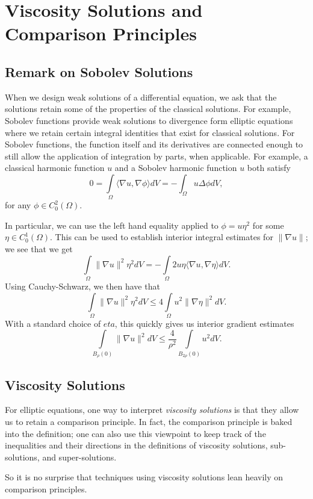 \section{Viscosity Solutions and Comparison Principles}

\subsection*{Remark on Sobolev Solutions}

When we design weak solutions of a differential equation, we ask that the solutions retain some of
the properties of the classical solutions. For example, Sobolev functions provide weak solutions
to divergence form elliptic equations where we retain certain integral identities that exist for classical
solutions. For Sobolev functions, the function itself and its derivatives are connected enough to still
allow the application of integration by parts, when applicable. For example, a classical harmonic function
\(u\) and a Sobolev harmonic function \(u\) both satisfy
\begin{equation}
0 = \int\limits_\Omega \langle \nabla u, \nabla \phi \rangle dV = -\int_\Omega u \Delta \phi dV, 
\end{equation} 
for any \(\phi \in C^2_0(\Omega)\).

In particular, we can use the left hand equality applied to \(\phi = u \eta^2\) for some \(\eta\in C^1_0(\Omega)\).
This can be used to establish interior integral estimates for \(\|\nabla u\|\); we see that we get
\begin{equation}
\int\limits_\Omega \|\nabla u\|^2 \eta^2 dV = - \int\limits_\Omega 2 u \eta \langle \nabla u, \nabla \eta \rangle dV. 
\end{equation}
Using Cauchy-Schwarz, we then have that 
\begin{equation}
\int\limits_\Omega \|\nabla u\|^2 \eta^2 dV \leq 4 \int\limits_\Omega u^2 \|\nabla \eta\|^2 dV.
\end{equation}
With a standard choice of \(eta\), this quickly gives us interior gradient estimates
\begin{equation}
\int\limits_{B_\rho(0)} \|\nabla u\|^2 dV \leq \frac{4}{\rho^2} \int\limits_{B_{2\rho}(0)} u^2 dV. 
\end{equation}

\subsection*{Viscosity Solutions}

For elliptic equations, one way to interpret \textit{viscosity solutions} is that they allow us to
retain a comparison principle. In fact, the comparison principle is baked into the definition; one can
also use this viewpoint to keep track of the inequalities and their directions in the definitions of 
viscosity solutions, sub-solutions, and super-solutions.

So it is no surprise that techniques using viscosity solutions lean heavily on comparison principles.
